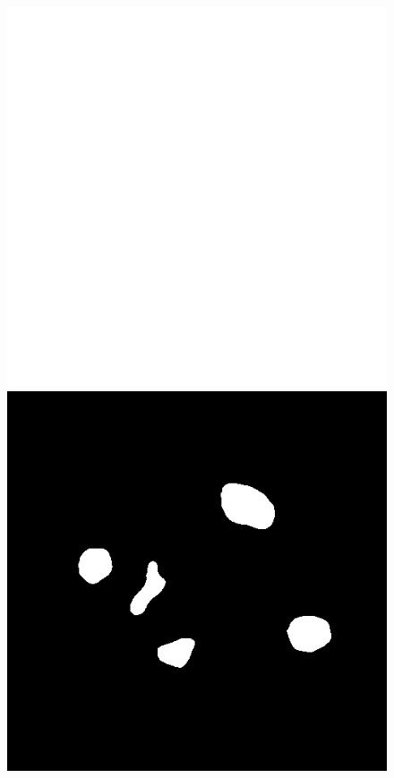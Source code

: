 \captionsetup{labelformat=empty}
\begin{figure}[ht!]
    \begin{minipage}[t]{\linewidth}
        \centering
        \begin{minipage}[t]{0.49\linewidth}
            \includegraphics[width=\textwidth, keepaspectratio]{./graphics/dataset_sample_1.png}  %
        \end{minipage}
        \begin{minipage}[t]{0.49\linewidth}
            \includegraphics[width=\textwidth, keepaspectratio]{./graphics/dataset_sample_1_label.png}  %
        \end{minipage}
    \end{minipage}


\end{figure}
